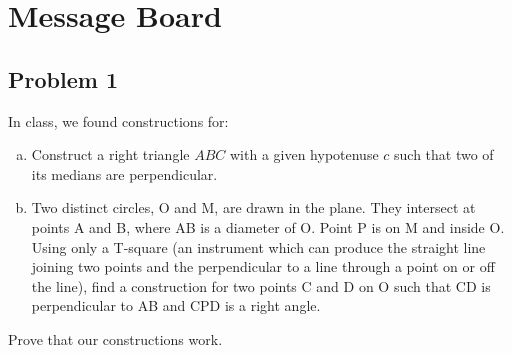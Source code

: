 \section{Message Board}

\subsection{Problem 1}

In class, we found constructions for:
\begin{enumerate}[a)]

\item Construct a right triangle $ABC$ with a given hypotenuse $c$ such that two of its medians are perpendicular.

\item Two distinct circles, O and M, are drawn in the plane. They intersect at points A and B, where AB is a diameter of O. Point P is on M and inside O. Using only a T-square (an instrument which can produce the straight line joining two points and the perpendicular to a line through a point on or off the line), find a construction for two points C and D on O such that CD is perpendicular to AB and CPD is a right angle.
\end{enumerate}

Prove that our constructions work.

